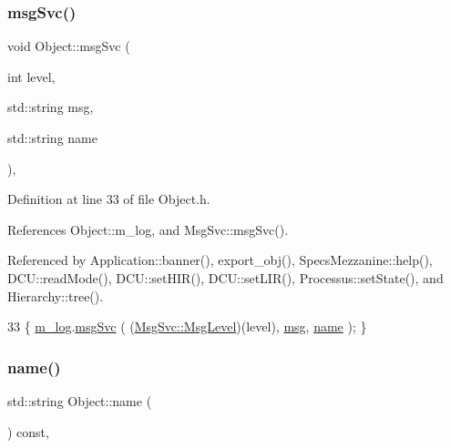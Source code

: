 \subsubsection{\texorpdfstring{msg\+Svc()}{msgSvc()}}
{\footnotesize\ttfamily void Object\+::msg\+Svc (\begin{DoxyParamCaption}\item[{int}]{level,  }\item[{std\+::string}]{msg,  }\item[{std\+::string}]{name }\end{DoxyParamCaption})\hspace{0.3cm}{\ttfamily [inline]}, {\ttfamily [inherited]}}



Definition at line 33 of file Object.\+h.



References Object\+::m\+\_\+log, and Msg\+Svc\+::msg\+Svc().



Referenced by Application\+::banner(), export\+\_\+obj(), Specs\+Mezzanine\+::help(), D\+C\+U\+::read\+Mode(), D\+C\+U\+::set\+H\+I\+R(), D\+C\+U\+::set\+L\+I\+R(), Processus\+::set\+State(), and Hierarchy\+::tree().


\begin{DoxyCode}
33 \{ \hyperlink{classObject_a0d269813dd7ac1f24bc143031e2963f2}{m\_log}.\hyperlink{classMsgSvc_ad25f18047920cc59a314e5098259711c}{msgSvc} ( (\hyperlink{classMsgSvc_ae671eb7301996cd049d2da8a65925926}{MsgSvc::MsgLevel})(level), \hyperlink{classObject_a58b2d0618c2d08cf2383012611528d97}{msg}, 
      \hyperlink{classObject_a300f4c05dd468c7bb8b3c968868443c1}{name} ); \}
\end{DoxyCode}
\mbox{\label{classObject_a300f4c05dd468c7bb8b3c968868443c1}} 
\subsubsection{\texorpdfstring{name()}{name()}}
{\footnotesize\ttfamily std\+::string Object\+::name (\begin{DoxyParamCaption}{ }\end{DoxyParamCaption}) const\hspace{0.3cm}{\ttfamily [inline]}, {\ttfamily [inherited]}}



